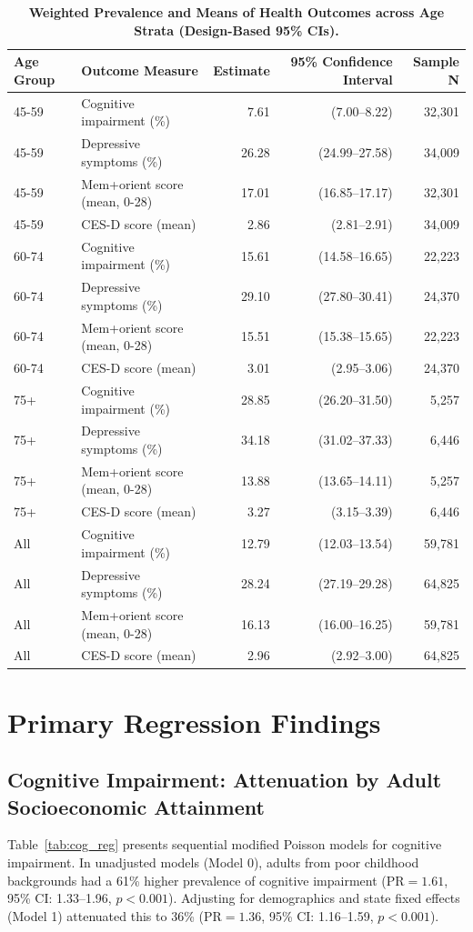 \documentclass[11pt,a4paper]{article}
\begin{document}
\begin{table}[H]
\centering
\small
\caption{\textbf{Weighted Prevalence and Means of Health Outcomes across Age Strata (Design-Based 95\% CIs).}}
\label{tab:outcomes_age}
\begin{tabular}{llrrr}
\toprule
\textbf{Age Group} & \textbf{Outcome Measure} & \textbf{Estimate} & \textbf{95\% Confidence Interval} & \textbf{Sample N} \\
\midrule
45-59 & Cognitive impairment (\%) & 7.61 & (7.00--8.22) & 32,301 \\
45-59 & Depressive symptoms (\%) & 26.28 & (24.99--27.58) & 34,009 \\
45-59 & Mem+orient score (mean, 0-28) & 17.01 & (16.85--17.17) & 32,301 \\
45-59 & CES-D score (mean) & 2.86 & (2.81--2.91) & 34,009 \\
60-74 & Cognitive impairment (\%) & 15.61 & (14.58--16.65) & 22,223 \\
60-74 & Depressive symptoms (\%) & 29.10 & (27.80--30.41) & 24,370 \\
60-74 & Mem+orient score (mean, 0-28) & 15.51 & (15.38--15.65) & 22,223 \\
60-74 & CES-D score (mean) & 3.01 & (2.95--3.06) & 24,370 \\
75+ & Cognitive impairment (\%) & 28.85 & (26.20--31.50) & 5,257 \\
75+ & Depressive symptoms (\%) & 34.18 & (31.02--37.33) & 6,446 \\
75+ & Mem+orient score (mean, 0-28) & 13.88 & (13.65--14.11) & 5,257 \\
75+ & CES-D score (mean) & 3.27 & (3.15--3.39) & 6,446 \\
All & Cognitive impairment (\%) & 12.79 & (12.03--13.54) & 59,781 \\
All & Depressive symptoms (\%) & 28.24 & (27.19--29.28) & 64,825 \\
All & Mem+orient score (mean, 0-28) & 16.13 & (16.00--16.25) & 59,781 \\
All & CES-D score (mean) & 2.96 & (2.92--3.00) & 64,825 \\
\bottomrule
\end{tabular}
\end{table}

\section{Primary Regression Findings}

\subsection{Cognitive Impairment: Attenuation by Adult Socioeconomic Attainment}
Table~\ref{tab:cog_reg} presents sequential modified Poisson models for cognitive impairment. In unadjusted models (Model 0), adults from poor childhood backgrounds had a 61\% higher prevalence of cognitive impairment ($\text{PR} = 1.61$, 95\% CI: 1.33--1.96, $p < 0.001$). Adjusting for demographics and state fixed effects (Model 1) attenuated this to 36\% ($\text{PR} = 1.36$, 95\% CI: 1.16--1.59, $p < 0.001$).
\end{document}
